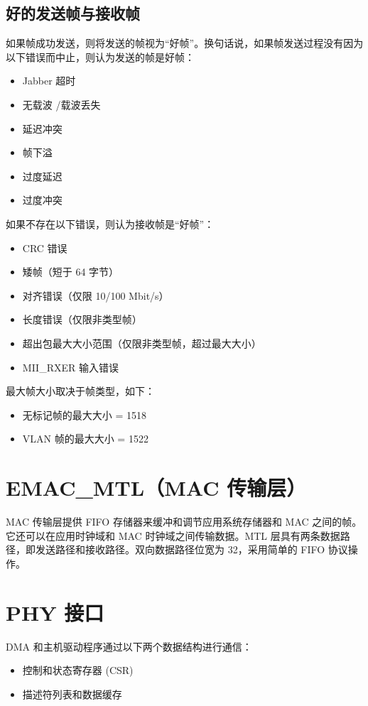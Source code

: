 \documentclass[main\_\_CN.tex]{subfiles}
\begin{document}
\subsection{好的发送帧与接收帧}
如果帧成功发送，则将发送的帧视为“好帧”。换句话说，如果帧发送过程没有因为以下错误而中止，则认为发送的帧是好帧：
\begin{itemize}
\item Jabber 超时
\item 无载波 /载波丢失
\item 延迟冲突
\item 帧下溢
\item 过度延迟
\item 过度冲突
\end{itemize}
如果不存在以下错误，则认为接收帧是“好帧”：
\begin{itemize}
\item CRC 错误
\item 矮帧（短于 64 字节）
\item 对齐错误（仅限 10/100 Mbit/s）
\item 长度错误（仅限非类型帧）
\item 超出包最大大小范围（仅限非类型帧，超过最大大小）
\item MII\_RXER 输入错误
\end{itemize}
最大帧大小取决于帧类型，如下：
\begin{itemize}
\item 无标记帧的最大大小 = 1518
\item VLAN 帧的最大大小 = 1522
\end{itemize}

\section{EMAC\_MTL（MAC 传输层）}
MAC 传输层提供 FIFO 存储器来缓冲和调节应用系统存储器和 MAC 之间的帧。它还可以在应用时钟域和 MAC 时钟域之间传输数据。MTL 层具有两条数据路径，即发送路径和接收路径。双向数据路径位宽为 32，采用简单的 FIFO 协议操作。

\section{PHY 接口}
DMA 和主机驱动程序通过以下两个数据结构进行通信：
\begin{itemize}
\item 控制和状态寄存器 (CSR)
\item 描述符列表和数据缓存
\end{itemize}
\end{document}
